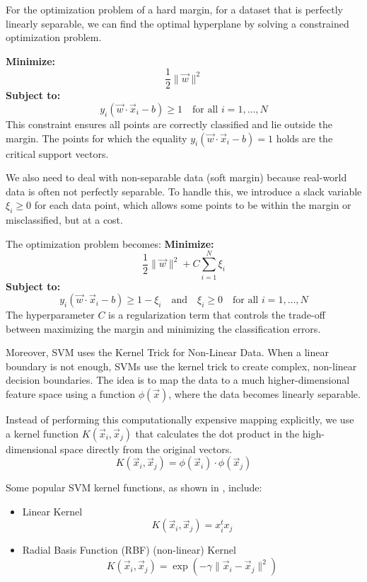 \documentclass[12pt,a4paper]{article}
\begin{document}
	For the optimization problem of a hard margin, for a dataset that is perfectly linearly separable, we can find the optimal hyperplane by solving a constrained optimization problem.
	
	\textbf{Minimize:}
	\[
	\frac{1}{2} \|\vec{w}\|^2
	\]
	\textbf{Subject to:}
	\[
	y_i(\vec{w} \cdot \vec{x}_i - b) \ge 1 \quad \text{for all } i=1, \dots, N
	\]
	This constraint ensures all points are correctly classified and lie outside the margin. The points for which the equality $y_i(\vec{w} \cdot \vec{x}_i - b) = 1$ holds are the critical support vectors.
	
	We also need to deal with non-separable data (soft margin) because real-world data is often not perfectly separable. To handle this, we introduce a slack variable $\xi_i \ge 0$ for each data point, which allows some points to be within the margin or misclassified, but at a cost.
	
	The optimization problem becomes:
	\textbf{Minimize:}
	\[
	\frac{1}{2} \|\vec{w}\|^2 + C \sum_{i=1}^{N} \xi_i
	\]
	\textbf{Subject to:}
	\[
	y_i(\vec{w} \cdot \vec{x}_i - b) \ge 1 - \xi_i \quad \text{and} \quad \xi_i \ge 0 \quad \text{for all } i=1, \dots, N
	\]
	The hyperparameter $C$ is a regularization term that controls the trade-off between maximizing the margin and minimizing the classification errors.
	
	Moreover, SVM uses the Kernel Trick for Non-Linear Data. When a linear boundary is not enough, SVMs use the kernel trick to create complex, non-linear decision boundaries. The idea is to map the data to a much higher-dimensional feature space using a function $\phi(\vec{x})$, where the data becomes linearly separable.
	
	Instead of performing this computationally expensive mapping explicitly, we use a kernel function $K(\vec{x}_i, \vec{x}_j)$ that calculates the dot product in the high-dimensional space directly from the original vectors.
	\[
	K(\vec{x}_i, \vec{x}_j) = \phi(\vec{x}_i) \cdot \phi(\vec{x}_j)
	\]
	
	Some popular SVM kernel functions, as shown in \cite{Dwarakanath2018}, include:
	\begin{itemize}
		\item Linear Kernel
		\[
		K(\vec{x}_i, \vec{x}_j) = x_i^t x_j
		\]
		\item Radial Basis Function (RBF) (non-linear) Kernel
		\[
		K(\vec{x}_i, \vec{x}_j) = \exp(-\gamma \|\vec{x}_i - \vec{x}_j\|^2)
		\]
	\end{itemize}
	
\end{document}
